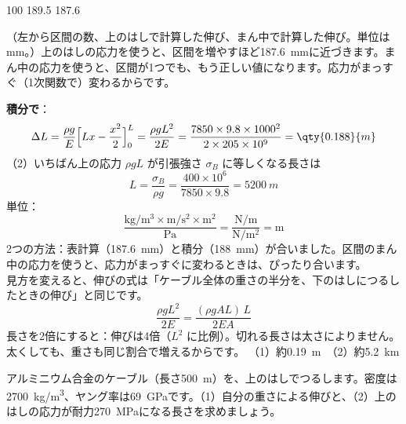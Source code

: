 \begin{phreidai}[自分の重さで伸びるケーブル]
\begin{phcodeout}
100 189.5 187.6
\end{phcodeout}
（左から区間の数、上のはしで計算した伸び、まん中で計算した伸び。単位は mm。）上のはしの応力を使うと、区間を増やすほど\qty{187.6}{mm}に近づきます。まん中の応力を使うと、区間が1つでも、もう正しい値になります。応力がまっすぐ（1次関数で）変わるからです。\par
\textbf{積分で}：
\[\Delta L=\frac{\rho g}{E}\Bigl[Lx-\frac{x^2}{2}\Bigr]_0^L=\frac{\rho gL^2}{2E}=\frac{7850\times9.8\times1000^2}{2\times205\times10^9}=\qty{0.188}{m}\]
（2）いちばん上の応力 $\rho gL$ が引張強さ $\sigma_B$ に等しくなる長さは
\[L=\frac{\sigma_B}{\rho g}=\frac{400\times10^6}{7850\times9.8}=\qty{5200}{m}\]
\phtashikame
単位：
\[\frac{\mathrm{kg/m^3}\times\mathrm{m/s^2}\times\mathrm{m^2}}{\mathrm{Pa}}=\frac{\mathrm{N/m}}{\mathrm{N/m^2}}=\mathrm{m}\]
2つの方法：表計算（\qty{187.6}{mm}）と積分（\qty{188}{mm}）が合いました。区間のまん中の応力を使うと、応力がまっすぐに変わるときは、ぴったり合います。\\
見方を変えると、伸びの式は「ケーブル全体の重さの半分を、下のはしにつるしたときの伸び」と同じです。
\[\frac{\rho gL^2}{2E}=\frac{(\rho gAL)\,L}{2EA}\]
長さを2倍にすると：伸びは4倍（$L^2$ に比例）。切れる長さは太さによりません。太くしても、重さも同じ割合で増えるからです。
\kotae （1）約\qty{0.19}{m}　（2）約\qty{5.2}{km}
\end{phreidai}
\begin{jibun}
アルミニウム合金のケーブル（長さ\qty{500}{m}）を、上のはしでつるします。密度は\qty{2700}{kg/m^3}、ヤング率は\qty{69}{GPa}です。（1）自分の重さによる伸びと、（2）上のはしの応力が耐力\qty{270}{MPa}になる長さを求めましょう。
\end{jibun}

